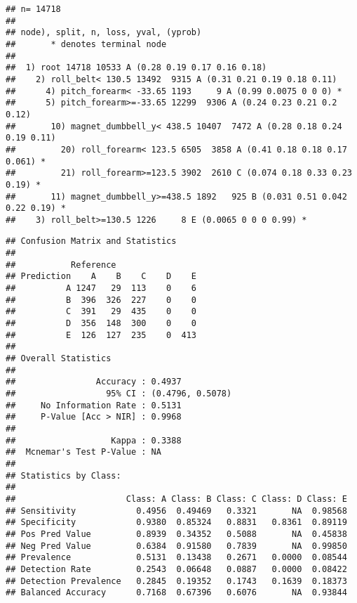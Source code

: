 \documentclass[]{article}
\newenvironment{Shaded}{\begin{snugshade}}{\end{snugshade}}
\newcommand{\KeywordTok}[1]{\textcolor[rgb]{0.13,0.29,0.53}{\textbf{{#1}}}}
\newcommand{\StringTok}[1]{\textcolor[rgb]{0.31,0.60,0.02}{{#1}}}
\newcommand{\NormalTok}[1]{{#1}}
\begin{document}
\begin{verbatim}
## n= 14718 
## 
## node), split, n, loss, yval, (yprob)
##       * denotes terminal node
## 
##  1) root 14718 10533 A (0.28 0.19 0.17 0.16 0.18)  
##    2) roll_belt< 130.5 13492  9315 A (0.31 0.21 0.19 0.18 0.11)  
##      4) pitch_forearm< -33.65 1193     9 A (0.99 0.0075 0 0 0) *
##      5) pitch_forearm>=-33.65 12299  9306 A (0.24 0.23 0.21 0.2 0.12)  
##       10) magnet_dumbbell_y< 438.5 10407  7472 A (0.28 0.18 0.24 0.19 0.11)  
##         20) roll_forearm< 123.5 6505  3858 A (0.41 0.18 0.18 0.17 0.061) *
##         21) roll_forearm>=123.5 3902  2610 C (0.074 0.18 0.33 0.23 0.19) *
##       11) magnet_dumbbell_y>=438.5 1892   925 B (0.031 0.51 0.042 0.22 0.19) *
##    3) roll_belt>=130.5 1226     8 E (0.0065 0 0 0 0.99) *
\end{verbatim}

\begin{Shaded}
\end{Shaded}

\begin{verbatim}
## Confusion Matrix and Statistics
## 
##           Reference
## Prediction    A    B    C    D    E
##          A 1247   29  113    0    6
##          B  396  326  227    0    0
##          C  391   29  435    0    0
##          D  356  148  300    0    0
##          E  126  127  235    0  413
## 
## Overall Statistics
##                                           
##                Accuracy : 0.4937          
##                  95% CI : (0.4796, 0.5078)
##     No Information Rate : 0.5131          
##     P-Value [Acc > NIR] : 0.9968          
##                                           
##                   Kappa : 0.3388          
##  Mcnemar's Test P-Value : NA              
## 
## Statistics by Class:
## 
##                      Class: A Class: B Class: C Class: D Class: E
## Sensitivity            0.4956  0.49469   0.3321       NA  0.98568
## Specificity            0.9380  0.85324   0.8831   0.8361  0.89119
## Pos Pred Value         0.8939  0.34352   0.5088       NA  0.45838
## Neg Pred Value         0.6384  0.91580   0.7839       NA  0.99850
## Prevalence             0.5131  0.13438   0.2671   0.0000  0.08544
## Detection Rate         0.2543  0.06648   0.0887   0.0000  0.08422
## Detection Prevalence   0.2845  0.19352   0.1743   0.1639  0.18373
## Balanced Accuracy      0.7168  0.67396   0.6076       NA  0.93844
\end{verbatim}
\end{document}
